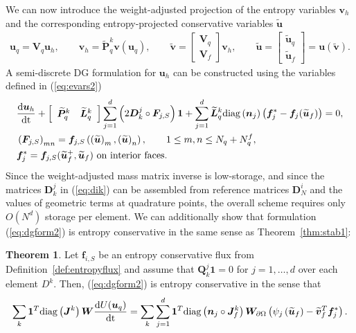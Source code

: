 \documentclass[10pt]{amsart}
\theoremstyle{definition}
\theoremstyle{lemma}
\theoremstyle{theorem}
\newtheorem{theorem}{Theorem}
\theoremstyle{assumption}
\renewcommand{\tilde}{\widetilde}
\newcommand{\td}[2]{\frac{{\rm d}#1}{{\rm d}{\rm #2}}}
\newcommand{\LRp}[1]{\left( #1 \right)}
\newcommand{\LRs}[1]{\left[ #1 \right]}
\newcommand{\diag}[1]{{\rm diag}\LRp{#1}}
\begin{document}
{We can now introduce the weight-adjusted projection of the entropy variables $\bm{v}_h$ and the corresponding entropy-projected conservative variables $\tilde{\bm{u}}$ 
\begin{align}
\bm{u}_q = \bm{V}_q \bm{u}_h, \qquad \bm{v}_h = \tilde{\bm{P}}^k_q \bm{v}\LRp{\bm{u}_q}, \qquad 
\tilde{\bm{v}} = \LRs{\begin{array}{c}
\bm{V}_q\\
\bm{V}_f
\end{array}}\bm{v}_h, \qquad \tilde{\bm{u}} =  \LRs{\begin{array}{c}
\tilde{\bm{u}}_q\\
\tilde{\bm{u}}_f
\end{array}} = \bm{u}\LRp{\tilde{\bm{v}}}.
\label{eq:evars2}
\end{align}
A semi-discrete DG formulation for $\bm{u}_h$ can be constructed using the variables defined in (\ref{eq:evars2})
\begin{align}
&\td{\bm{u}_h}{t} + \LRs{\begin{array}{cc}\tilde{\bm{P}}^k_q & \tilde{\bm{L}}^k_q\end{array}}
  \sum_{j=1}^d \LRp{2\bm{D}^j_k \circ \bm{F}_{j,S}}\bm{1} + \sum_{j=1}^d \tilde{\bm{L}}^k_q \diag{\bm{n}_j}\LRp{\bm{f}_j^* - \bm{f}_j(\tilde{\bm{u}}_f)} = 0,\label{eq:dgform2}\\
  &\LRp{\bm{F}_{j,S}}_{mn} = \bm{f}_{j,S}\LRp{\LRp{\tilde{\bm{u}}}_m,\LRp{\tilde{\bm{u}}}_n}, \qquad 1 \leq m,n \leq N_q + N^f_q,\nonumber\\
  &\bm{f}_j^* = \bm{f}_{j,S}(\tilde{\bm{u}}_f^+,\tilde{\bm{u}}_f) \text{ on interior faces}.\nonumber
\end{align}
Since the  weight-adjusted mass matrix inverse is low-storage, and since the matrices $\bm{D}^j_k$ in (\ref{eq:dik}) can be assembled from reference matrices $\bm{D}^i_N$ and the values of geometric terms at quadrature points, the overall scheme requires only $O(N^d)$ storage per element.  We can additionally show that formulation (\ref{eq:dgform2}) is entropy conservative in the same sense as Theorem~\ref{thm:stab1}: 
\begin{theorem}
  Let $\bm{f}_{i,S}$ be an entropy conservative flux from Definition~\ref{def:entropyflux} and assume that $\bm{Q}^j_k\bm{1} = 0$ for $j = 1,\ldots,d$ over each element $D^k$.  Then, (\ref{eq:dgform2}) is entropy conservative in the sense that
\[
  \sum_k \bm{1}^T\diag{\bm{J}^k}\bm{W}\td{U(\bm{u}_q)}{t} = \sum_k \sum_{j=1}^d \bm{1}^T\diag{\bm{n}_j\circ\bm{J}^k_f}\bm{W}_{\partial \Omega} \LRp{\psi_j\LRp{\tilde{\bm{u}}_f}-\tilde{\bm{v}}_f^T\bm{f}_j^*}.
\]
\end{theorem}}
\end{document}
